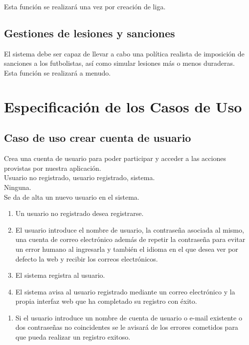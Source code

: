 Esta función se realizará una vez por creación de liga.
\subsection{Gestiones de lesiones y sanciones}
El sistema debe ser capaz de llevar a cabo una política realista de imposición
de sanciones a los futbolistas, así como simular lesiones
más o menos duraderas.\\

Esta función se realizará a menudo.

\section{Especificación de los Casos de Uso}
\subsection{Caso de uso crear cuenta de usuario}
 Crea una cuenta de usuario para poder
participar y acceder a las acciones provistas por nuestra aplicación.\\
 Usuario no registrado, usuario registrado,
sistema. \\
 Ninguna. \\
 Se da de alta un nuevo usuario en el
sistema. \\
\begin{enumerate}
\item Un usuario no registrado desea registrarse.
\item El usuario introduce el nombre de usuario, la contraseña asociada al
  mismo, una cuenta de correo electrónico además de repetir la contraseña para
  evitar un error humano al ingresarla y también el idioma en el que desea ver
  por defecto la web y recibir los correos electrónicos.
\item El sistema registra al usuario.
\item El sistema avisa al usuario registrado mediante un correo electrónico y la
  propia interfaz web que ha completado su registro con éxito.
\end{enumerate}
\begin{enumerate}
\item Si el usuario introduce un nombre de cuenta de usuario o e-mail existente
  o dos contraseñas no coincidentes se le avisará de los errores cometidos para
  que pueda realizar un registro exitoso.
\end{enumerate}

